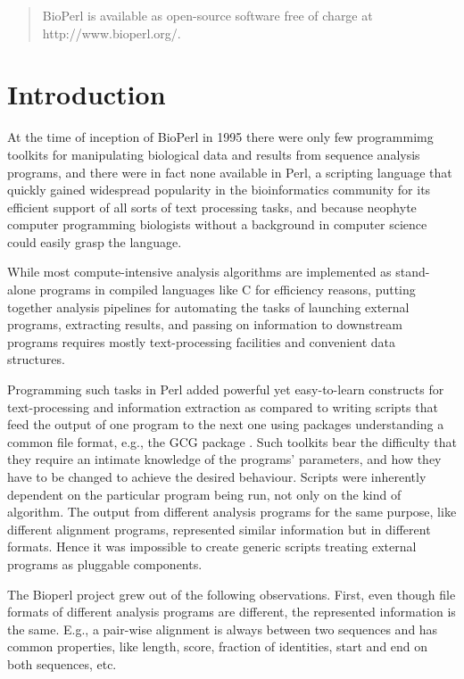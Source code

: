 \documentclass{article}
\begin{document}
\begin{twocolumn}
\begin{abstract}
 BioPerl is available as open-source software free
of charge at http://www.bioperl.org/.

\end{abstract}

\section{Introduction}
At the time of inception of BioPerl in 1995 there were only few
programmimg toolkits for manipulating biological data and results from
sequence analysis programs, and there were in fact none available in
Perl, a scripting language that quickly gained widespread popularity
in the bioinformatics community for its efficient support of all sorts
of text processing tasks, and because neophyte computer programming
biologists without a background in computer science could easily grasp
the language.

While most compute-intensive analysis algorithms are implemented as
stand-alone programs in compiled languages like C for efficiency
reasons, putting together analysis pipelines for automating the tasks
of launching external programs, extracting results, and passing on
information to downstream programs requires mostly text-processing
facilities and convenient data structures.

Programming such tasks in Perl added powerful yet easy-to-learn
constructs for text-processing and information extraction as compared
to writing scripts that feed the output of one program to the next one
using packages understanding a common file format, e.g., the GCG
package \cite{GCG}. Such toolkits bear the difficulty that they
require an intimate knowledge of the programs' parameters, and how
they have to be changed to achieve the desired behaviour. Scripts were
inherently dependent on the particular program being run, not only on
the kind of algorithm. The output from different analysis programs for
the same purpose, like different alignment programs, represented
similar information but in different formats. Hence it was impossible
to create generic scripts treating external programs as pluggable
components.

The Bioperl project grew out of the following observations. First,
even though file formats of different analysis programs are different,
the represented information is the same. E.g., a pair-wise alignment
is always between two sequences and has common properties, like
length, score, fraction of identities, start and end on both
sequences, etc. 


\end{twocolumn}
\end{document}
